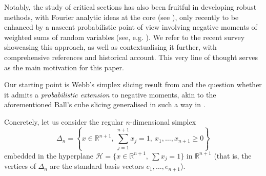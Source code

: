 \documentclass[10pt]{amsart}
\newcommand{\1}{\textbf{1}}
\newcommand{\R}{\mathbb{R}}
\newcommand{\red}{}
\theoremstyle{remark}
\theoremstyle{definition}
\begin{document}
Notably, the study of critical sections has also been fruitful in developing robust methods, with Fourier analytic ideas at the core (see \cite{Kol-book}), only recently to be {\red enhanced} by a nascent  probabilistic point of view involving negative moments of weighted sums of random variables (see, e.g. \cite{CKT, CNT, ENT3}). We refer to the recent survey \cite{NT-surv} showcasing this approach, as well as contextualising it further, with comprehensive references and historical account. This very line of thought serves as the main motivation for this paper.

Our starting point is Webb's simplex slicing result from \cite{W} and the question whether it admits a \emph{probabilistic extension} to negative moments, {\red akin to} the aforementioned Ball's cube slicing generalised in such a way in \cite{CKT}. 

Concretely, let us consider the regular $n$-dimensional simplex
\[ 
\Delta_n = \left\{x \in \R^{n+1}, \ \sum_{j=1}^{n+1} x_j = 1, \ x_1, \dots, x_{n+1} \geq 0\right\}
 \]
embedded in the hyperplane $\mathcal{H} = \{x \in \R^{n+1}, \ \sum x_j = 1\}$ in $\R^{n+1}$ (that is, the vertices of $\Delta_n$ are the standard basis vectors $e_1, \dots, e_{n+1}$). 
\end{document}
